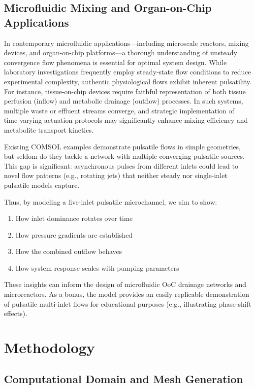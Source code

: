 \documentclass[12pt,a4paper]{article}
\begin{document}
\subsection{Microfluidic Mixing and Organ-on-Chip Applications}

In contemporary microfluidic applications---including microscale reactors, mixing devices, and organ-on-chip platforms---a thorough understanding of unsteady convergence flow phenomena is essential for optimal system design. While laboratory investigations frequently employ steady-state flow conditions to reduce experimental complexity, authentic physiological flows exhibit inherent pulsatility. For instance, tissue-on-chip devices require faithful representation of both tissue perfusion (inflow) and metabolic drainage (outflow) processes. In such systems, multiple waste or effluent streams converge, and strategic implementation of time-varying actuation protocols may significantly enhance mixing efficiency and metabolite transport kinetics. 

Existing COMSOL examples demonstrate pulsatile flows in simple geometries, but seldom do they tackle a network with multiple converging pulsatile sources. This gap is significant: asynchronous pulses from different inlets could lead to novel flow patterns (e.g., rotating jets) that neither steady nor single-inlet pulsatile models capture.

Thus, by modeling a five-inlet pulsatile microchannel, we aim to show:
\begin{enumerate}[label=(\alph*)]
  \item How inlet dominance rotates over time
  \item How pressure gradients are established
  \item How the combined outflow behaves
  \item How system response scales with pumping parameters
\end{enumerate}

These insights can inform the design of microfluidic OoC drainage networks and microreactors. As a bonus, the model provides an easily replicable demonstration of pulsatile multi-inlet flows for educational purposes (e.g., illustrating phase-shift effects).

\section{Methodology}
\subsection{Computational Domain and Mesh Generation}
\end{document}
